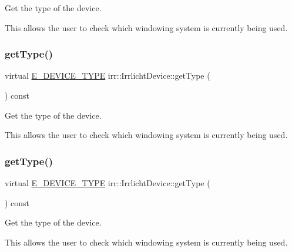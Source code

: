 Get the type of the device. 

This allows the user to check which windowing system is currently being used. \mbox{\label{classirr_1_1IrrlichtDevice_a2a2ec439b1f153169003c4d3e986a7d7}} 
\subsubsection{\texorpdfstring{get\+Type()}{getType()}\hspace{0.1cm}{\footnotesize\ttfamily [2/3]}}
{\footnotesize\ttfamily virtual \hyperlink{namespaceirr_ac25d94cf2e1037c7ca18ee79b3bd4505}{E\+\_\+\+D\+E\+V\+I\+C\+E\+\_\+\+T\+Y\+PE} irr\+::\+Irrlicht\+Device\+::get\+Type (\begin{DoxyParamCaption}{ }\end{DoxyParamCaption}) const\hspace{0.3cm}{\ttfamily [pure virtual]}}



Get the type of the device. 

This allows the user to check which windowing system is currently being used. \mbox{\label{classirr_1_1IrrlichtDevice_a2a2ec439b1f153169003c4d3e986a7d7}} 
\subsubsection{\texorpdfstring{get\+Type()}{getType()}\hspace{0.1cm}{\footnotesize\ttfamily [3/3]}}
{\footnotesize\ttfamily virtual \hyperlink{namespaceirr_ac25d94cf2e1037c7ca18ee79b3bd4505}{E\+\_\+\+D\+E\+V\+I\+C\+E\+\_\+\+T\+Y\+PE} irr\+::\+Irrlicht\+Device\+::get\+Type (\begin{DoxyParamCaption}{ }\end{DoxyParamCaption}) const\hspace{0.3cm}{\ttfamily [pure virtual]}}



Get the type of the device. 

This allows the user to check which windowing system is currently being used. \mbox{\label{classirr_1_1IrrlichtDevice_a4eb5bc1b15f552ce2c37d792231392f7}} 
